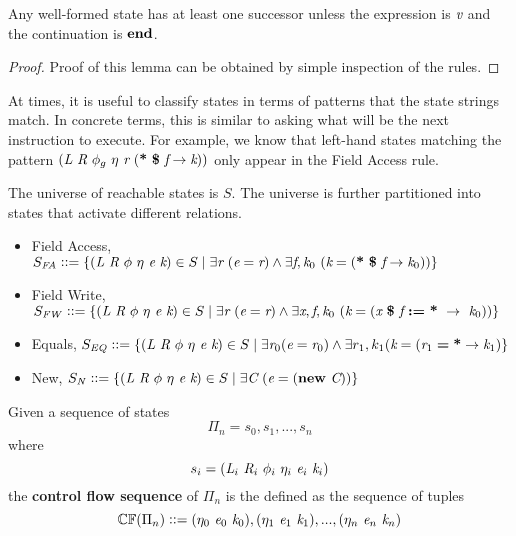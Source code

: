 \begin{lemma}
\label{lem:succ}
Any well-formed state has at least one successor unless the expression is $\emph{v}$ and the continuation is $\textbf{end}$.
\end{lemma}
\begin{proof}
Proof of this lemma can be obtained by simple inspection of the rules.
\end{proof}

At times, it is useful to classify states in terms of patterns that the state strings match. In concrete terms, this is similar to asking what will be the next instruction to execute. For example, we know that left-hand states matching the pattern $ \lp \cfgnt{L}\ \cfgnt{R}\ \phi_g\ \eta\ \cfgnt{r}\ \lp \cfgt{*}\ \cfgt{\$}\ \cfgnt{f} \rightarrow \cfgnt{k}\rp \rp$ only appear in the Field Access rule.

\begin{definition}
The universe of reachable states is $S$. The universe is further partitioned into states that activate different relations.
\begin{itemize}
\item Field Access, $S_\mathit{FA} \vcentcolon \vcentcolon={} \{( \emph{L}\ \emph{R}\ \phi\ \eta\ \emph{e}\ \emph{k} ) \in S \mid \exists \emph{r}\ (\emph{e} = \emph{r}) \wedge \exists \emph{f},\emph{k}_0\ (\emph{k} = ( \textbf{*}\ \textbf{\$}\ \emph{f} \rightarrow \emph{k}_0)) \}$
\item Field Write,  $S_\mathit{FW} \defeq{} \{\lp \cfgnt{L}\ \cfgnt{R}\ \phi\ \eta\ \cfgnt{e}\ \cfgnt{k} \rp \in S \mid \exists \cfgnt{r}\ (\cfgnt{e} = \cfgnt{r}) \wedge \exists \cfgnt{x},\cfgnt{f},\cfgnt{k}_0\ (\cfgnt{k} = \lp \cfgnt{x}\ \cfgt{\$}\ \cfgnt{f}\ \cfgt{:=}\ \cfgt{*}\ \rightarrow\ \cfgnt{k}_0\rp) \}$
\item Equals, $S_\mathit{EQ} \vcentcolon \vcentcolon={} \{( \emph{L}\ \emph{R}\ \phi\ \eta\ \emph{e}\ \emph{k} ) \in S \mid \exists \emph{r}_0 (\emph{e} = \emph{r}_0) \wedge \exists r_1, k_1(\emph{k} = ( \emph{r}_1\; \textbf{=}\; \textbf{*} \rightarrow \emph{k}_1) \}$
\item New, $S_\mathit{N} \vcentcolon \vcentcolon={} \{( \emph{L}\ \emph{R}\ \phi\ \eta\ \emph{e}\ \emph{k} ) \in S \mid \exists \emph{C}\ (\emph{e} = ( \textbf{new}\ \emph{C})) \}$
\end{itemize} 
\end{definition}


\begin{definition}
Given a sequence of states $$\Pi_n = s_0,s_1,...,s_n$$ where $$s_i = (\cfgnt{L}_i\ \cfgnt{R}_i\ \phi_i\ \eta_i\ \cfgnt{e}_i\ \cfgnt{k}_i )$$ the \textbf{control flow sequence} of $\Pi_n$ is the defined as the sequence of tuples $$ \mathbb{CF}(\Pi_n) \defeq{} (\eta_0\ \cfgnt{e}_0\ \cfgnt{k}_0),(\eta_1\ \cfgnt{e}_1\ \cfgnt{k}_1),...,(\eta_n\ \cfgnt{e}_n\ \cfgnt{k}_n)$$
\end{definition}

